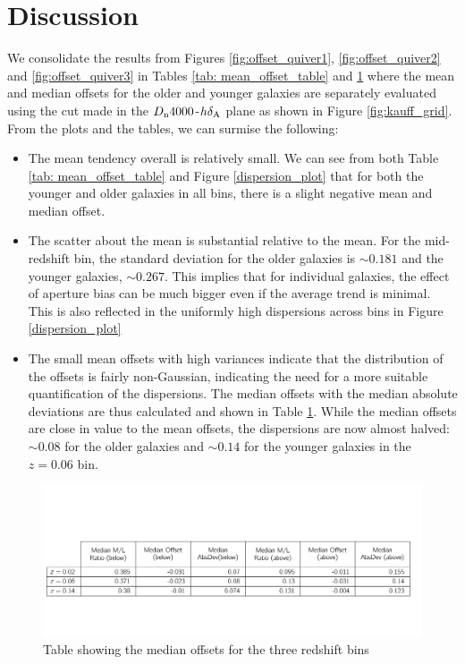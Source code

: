\section{Discussion}

We consolidate the results from Figures \ref{fig:offset_quiver1}, \ref{fig:offset_quiver2} and \ref{fig:offset_quiver3} in Tables \ref{tab: mean_offset_table} and  \ref{tab: median_offsets} where the mean and median offsets for the older and younger galaxies are separately evaluated using the cut made in the $D_{\rm n}4000$-$h\delta_{\rm A}$ plane as shown in Figure \ref{fig:kauff_grid}. From the plots and the tables, we can surmise the following:

\begin{itemize}
\item{The mean tendency overall is relatively small. We can see from both Table \ref{tab: mean_offset_table} and Figure \ref{dispersion_plot} that for both the younger and older galaxies in all bins, there is a slight negative mean and median offset.}
\item{The scatter about the mean is substantial relative to the mean. For the mid-redshift bin, the standard deviation for the older galaxies is $\sim 0.181$ and the younger galaxies, $\sim 0.267$. This implies that for individual galaxies, the effect of aperture bias can be much bigger even if the average trend is minimal. This is also reflected in the uniformly high dispersions across bins in Figure \ref{dispersion_plot}}
\item{The small mean offsets with high variances indicate that the distribution of the offsets is fairly non-Gaussian, indicating the need for a more suitable quantification of the dispersions. The median offsets with the median absolute deviations are thus calculated and shown in Table \ref{tab: median_offsets}. While the median offsets are close in value to the mean offsets, the dispersions are now almost halved: $\sim 0.08$ for the older galaxies and $\sim 0.14$ for the younger galaxies in the $z = 0.06$ bin.}
\end{itemize}

\begin{figure}
\includegraphics[width=\textwidth]{figures/table_median.pdf}
\caption[Table showing the median offsets for the three redshift bins.]
{Table showing the median offsets for the three redshift bins
\label{tab: median_offsets}}
\end{figure}

